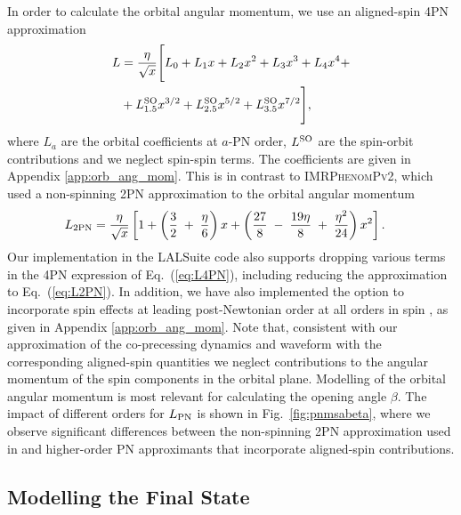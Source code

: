\documentclass[%
aps,
prd,
amssymb,
amsmath,
amsfonts,
eqsecnum,
showpacs,
nofootinbib,
floatfix,
twocolumn,
twoside,
a4paper,
superscriptaddress
]{revtex4-1}
\newcommand{\twopn}{2 \rm{PN}}
\newcommand{\ppvtwo}{\textsc{IMRPhenomPv2}\xspace}
\begin{document}
In order to calculate the orbital angular momentum, we use an aligned-spin 4PN approximation  \cite{Blanchet:2006zz,LeTiec:2011ab,Bohe:2012mr,Damour:2014jta,Bernard:2017ktp,Blanchet:2017rcn} 
\begin{align}\label{eq:L4PN}
    L &= \frac{\eta}{\sqrt{x}} \Bigg[ L_0 + L_1 x + L_2 x^2 + L_3 x^3 + L_4 x^4 + \\ \nonumber &+ L^{\rm{SO}}_{1.5} x^{3/2} + L^{\rm{SO}}_{2.5} x^{5/2} + L^{\rm{SO}}_{3.5} x^{7/2} \Bigg],
\end{align}
where $L_{a}$ are the orbital coefficients at $a$-PN order, $L^{\rm{SO}}$ are the spin-orbit contributions and we neglect spin-spin terms. The coefficients are given in Appendix \ref{app:orb_ang_mom}. 
%
This is in contrast to \ppvtwo, which used a non-spinning 2PN approximation to the orbital angular momentum
\begin{align}\label{eq:L2PN}
    L_{\twopn} &= \frac{\eta}{\sqrt{x}} \left[ 1 + \left( \frac{3}{2} \; + \; \frac{\eta}{6} \right) x + \left( \frac{27}{8} \; - \; \frac{19 \eta}{8} \; + \; \frac{\eta^2}{24} \right) x^2 \right] .
\end{align}
Our implementation in the LALSuite code also supports dropping various terms in the 4PN expression of Eq.~(\ref{eq:L4PN}), including reducing the approximation to Eq.~(\ref{eq:L2PN}). In addition, we have also implemented the option to incorporate spin effects at leading post-Newtonian order at all orders in spin \cite{Marsat:2014xea,Vines:2016qwa,Siemonsen:2017yux}, as given in Appendix \ref{app:orb_ang_mom}.
%
Note that, consistent with our approximation of the co-precessing dynamics and waveform with the corresponding aligned-spin quantities we neglect contributions to the angular momentum of the spin components in the orbital plane. Modelling of the orbital angular momentum is most relevant for calculating the opening angle $\beta$. The impact of different orders for $L_{\rm PN}$ is shown in Fig.~\ref{fig:pnmsabeta}, where we observe significant differences between the non-spinning 2PN approximation used in \cite{Bohe:PPv2} and higher-order PN approximants that incorporate aligned-spin contributions. 



\subsection{Modelling the Final State}\label{sec:final_state}
\end{document}

